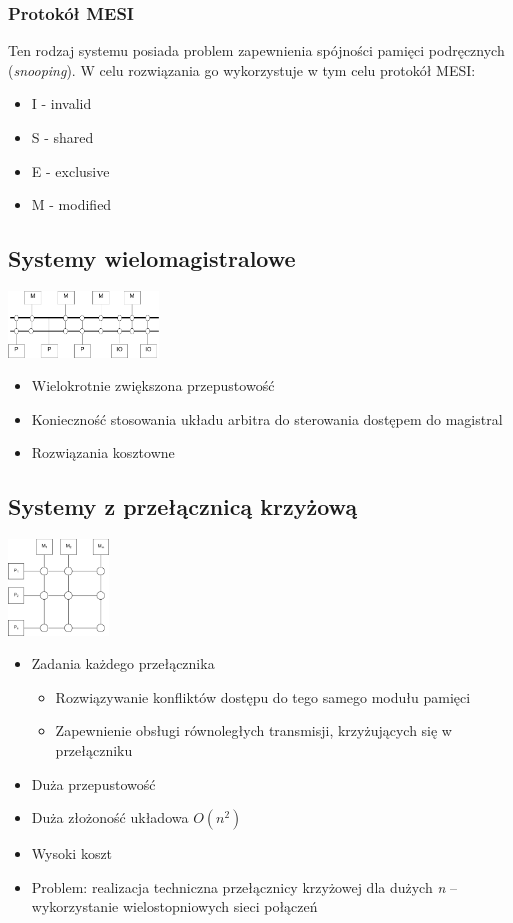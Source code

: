 \documentclass[a4paper,twoside]{article}
\begin{document}
\subsubsection{Protokół MESI}
Ten rodzaj systemu posiada problem zapewnienia spójności pamięci podręcznych (\emph{snooping}). W celu rozwiązania go wykorzystuje w tym celu protokół MESI:
\begin{itemize}
	\item I - invalid
	\item S - shared
	\item E - exclusive
	\item M - modified
\end{itemize}
\subsection{Systemy wielomagistralowe}
\includegraphics[width=0.3\textwidth]{./images/wieloproc01}
\begin{itemize}
	\item Wielokrotnie zwiększona przepustowość
	\item Konieczność stosowania układu arbitra do sterowania dostępem do magistral
	\item Rozwiązania kosztowne
\end{itemize}
\subsection{Systemy z przełącznicą krzyżową}
\includegraphics[width=0.2\textwidth]{./images/wieloproc02}
\begin{itemize}
	\item Zadania każdego przełącznika
	\begin{itemize}
		\item Rozwiązywanie konfliktów dostępu do tego samego modułu pamięci
		\item Zapewnienie obsługi równoległych transmisji, krzyżujących się w przełączniku
	\end{itemize}
	\item Duża przepustowość
	\item Duża złożoność układowa $ O(n^2) $
	\item Wysoki koszt
	\item Problem: realizacja techniczna przełącznicy krzyżowej dla dużych \emph{n} – wykorzystanie wielostopniowych sieci połączeń
\end{itemize}
\end{document}
